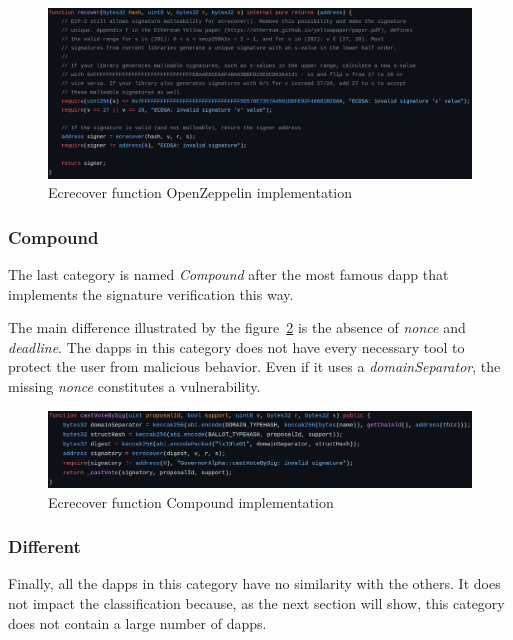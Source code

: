 \documentclass{iitFirstPage}
\begin{document}
    \begin{figure}[H]
        \centering
        \includegraphics[width=0.9 \linewidth]{ecrecover/ecrecover_function_openzep}
        \caption{Ecrecover function OpenZeppelin implementation}
        \label{fig:ecrecover_openzep}
    \end{figure}

    \subsubsection{Compound}

    The last category is named \textit{Compound} after the most famous \Gls{dapp} that implements the signature verification this way.

    The main difference illustrated by the figure~\ref{fig:ecrecover_compound} is the absence of \textit{nonce} and \textit{deadline}.
    The \Glspl{dapp} in this category does not have every necessary tool to protect the user from malicious behavior.
    Even if it uses a \textit{domainSeparator}, the missing \textit{nonce} constitutes a vulnerability.

    \begin{figure}[H]
        \centering
        \includegraphics[width=0.9 \linewidth]{ecrecover/ecrecover_function_compound}
        \caption{Ecrecover function Compound implementation}
        \label{fig:ecrecover_compound}
    \end{figure}

    \subsubsection{Different}

    Finally, all the \Glspl{dapp} in this category have no similarity with the others.
    It does not impact the classification because, as the next section will show, this category does not contain a large number of \Glspl{dapp}.
\end{document}
